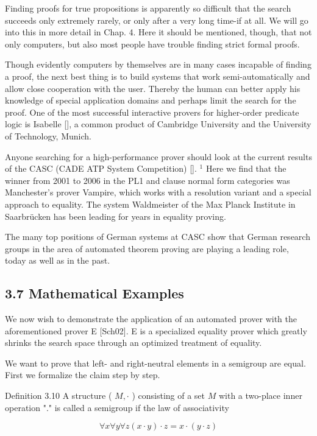 \documentclass[10pt]{article}
\begin{document}
Finding proofs for true propositions is apparently so difficult that the search succeeds only extremely rarely, or only after a very long time-if at all. We will go into this in more detail in Chap. 4. Here it should be mentioned, though, that not only computers, but also most people have trouble finding strict formal proofs.

Though evidently computers by themselves are in many cases incapable of finding a proof, the next best thing is to build systems that work semi-automatically and allow close cooperation with the user. Thereby the human can better apply his knowledge of special application domains and perhaps limit the search for the proof. One of the most successful interactive provers for higher-order predicate logic is Isabelle [\cite{nipkow2002isabelle}], a common product of Cambridge University and the University of Technology, Munich.

Anyone searching for a high-performance prover should look at the current results of the CASC (CADE ATP System Competition) [\cite{sutcliffe2006state}]. ${ }^{1}$ Here we find that the winner from 2001 to 2006 in the PL1 and clause normal form categories was Manchester's prover Vampire, which works with a resolution variant and a special approach to equality. The system Waldmeister of the Max Planck Institute in Saarbrücken has been leading for years in equality proving.

The many top positions of German systems at CASC show that German research groups in the area of automated theorem proving are playing a leading role, today as well as in the past.

\subsection*{3.7 Mathematical Examples}
We now wish to demonstrate the application of an automated prover with the aforementioned prover E [Sch02]. E is a specialized equality prover which greatly shrinks the search space through an optimized treatment of equality.

We want to prove that left- and right-neutral elements in a semigroup are equal. First we formalize the claim step by step.

Definition 3.10 A structure ( $M, \cdot$ ) consisting of a set $M$ with a two-place inner operation "." is called a semigroup if the law of associativity

$$
\forall x \forall y \forall z(x \cdot y) \cdot z=x \cdot(y \cdot z)
$$
\end{document}
